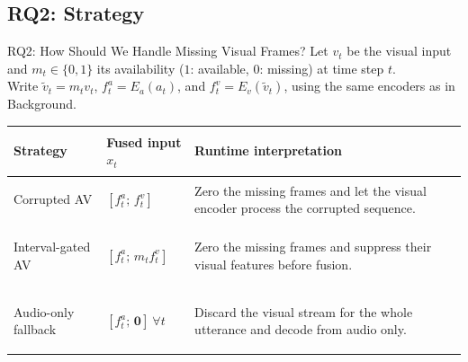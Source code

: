 \subsection{RQ2: Strategy}

\begin{frame}{RQ2: How Should We Handle Missing Visual Frames?}
  \scriptsize
  Let $v_t$ be the visual input and $m_t\in\{0,1\}$ its availability ($1$: available, $0$: missing) at time step $t$.\\
  Write $\widetilde v_t=m_tv_t$, $f_t^a=E_a(a_t)$, and $f_t^v=E_v(\widetilde v_t)$, using the same encoders as in Background.
  \vspace{0.03cm}

  \renewcommand{\arraystretch}{1.20}
  \begin{tabularx}{\textwidth}{
    >{\bfseries\raggedright\arraybackslash}p{}
    >{\centering\arraybackslash}p{}
    >{\raggedright\arraybackslash}X}
    \toprule
    Strategy & Fused input $x_t$ & Runtime interpretation \\
    \midrule
    Corrupted AV &
    $[f_t^a;\,f_t^v]$ &
    Zero the missing frames and let the visual encoder process the corrupted sequence. \\
    Interval-gated AV &
    $[f_t^a;\,m_tf_t^v]$ &
    Zero the missing frames and suppress their visual features before fusion. \\
    Audio-only fallback &
    $[f_t^a;\,\mathbf{0}]\ \forall t$ &
    Discard the visual stream for the whole utterance and decode from audio only. \\
    \bottomrule
  \end{tabularx}
  \vspace{0.06cm}


\end{frame}
